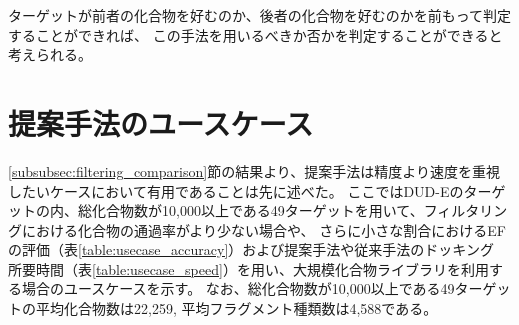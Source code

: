ターゲットが前者の化合物を好むのか、後者の化合物を好むのかを前もって判定することができれば、
この手法を用いるべきか否かを判定することができると考えられる。


\section{提案手法のユースケース}
\ref{subsubsec:filtering_comparison}節の結果より、提案手法は精度より速度を重視したいケースにおいて有用であることは先に述べた。
ここではDUD-Eのターゲットの内、総化合物数が10,000以上である49ターゲットを用いて、フィルタリングにおける化合物の通過率がより少ない場合や、
さらに小さな割合におけるEFの評価（表\ref{table:usecase_accuracy}）および提案手法や従来手法のドッキング
所要時間（表\ref{table:usecase_speed}）を用い、大規模化合物ライブラリを利用する場合のユースケースを示す。
なお、総化合物数が10,000以上である49ターゲットの平均化合物数は22,259, 平均フラグメント種類数は4,588である。

